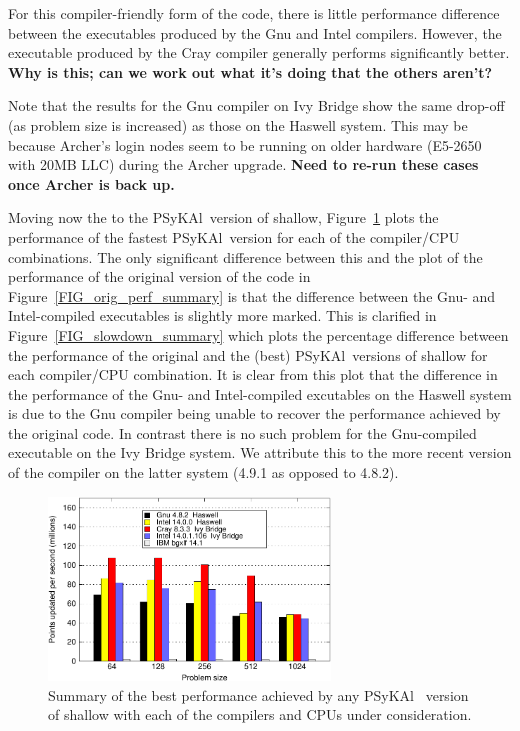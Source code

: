 \documentclass[journal]{IEEEtran}
\newcommand{\psykal}{{PS}y{KA}l\ }
\begin{document}
For this compiler-friendly form of the code, there is little
performance difference between the executables produced by the Gnu and
Intel compilers. However, the executable produced by the Cray compiler
generally performs significantly better. {\bf Why is this; can we work
out what it's doing that the others aren't?}

Note that the results for the Gnu compiler on Ivy Bridge show the same
drop-off (as problem size is increased) as those on the Haswell
system. This may be because Archer's login nodes seem to be running on
older hardware (E5-2650 with 20MB LLC) during the Archer upgrade. {\bf
  Need to re-run these cases once Archer is back up.}

Moving now the to the \psykal version of shallow,
Figure~\ref{FIG_best_psykal_perf_summary} plots the performance of the
fastest \psykal version for each of the compiler/CPU combinations. The
only significant difference between this and the plot of the
performance of the original version of the code in
Figure~\ref{FIG_orig_perf_summary} is that the difference between the
Gnu- and Intel-compiled executables is slightly more marked. This is
clarified in Figure~\ref{FIG_slowdown_summary} which plots the
percentage difference between the performance of the original and the
(best) \psykal versions of shallow for each compiler/CPU combination.
It is clear from this plot that the difference in the performance of
the Gnu- and Intel-compiled excutables on the Haswell system is due to
the Gnu compiler being unable to recover the performance achieved by
the original code. In contrast there is no such problem for the
Gnu-compiled executable on the Ivy Bridge system. We attribute this to
the more recent version of the compiler on the latter system (4.9.1 as
opposed to 4.8.2).

\begin{figure}[!t]
\centering
\includegraphics[width=7.5cm]{best_psykal_summary}
\caption{Summary of the best performance achieved by any \psykal 
version of shallow with each of the compilers and CPUs under 
consideration.}
\label{FIG_best_psykal_perf_summary}
\end{figure}
\end{document}
